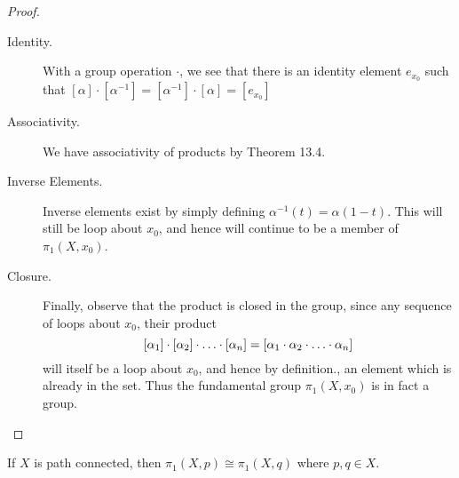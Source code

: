 \documentclass[a4paper,12pt,twoside]{hmcpset}
\begin{document}
\begin{proof}
    \begin{description}
        \item[Identity.] With a group operation $\cdot$, we see that there is an identity
        element $e_{x_0}$ such that $[\alpha] \cdot [\alpha^{-1}] =
        [\alpha^{-1}] \cdot [\alpha] = [e_{x_0}]$ 
        
        \item[Associativity.] We have associativity of products by Theorem 13.4. 
        
        \item[Inverse Elements.] Inverse elements exist by simply defining $\alpha^{-1}(t) = \alpha(1
        - t)$. This will still be loop about $x_0$, and hence will
        continue to be a member of $\pi_1(X, x_0)$.

        \item[Closure.] Finally, observe that the product is closed in the group, since
        any sequence of loops about $x_0$, their product
        \[
            [\alpha_{1}]\cdot[\alpha_{2}]\cdot \vspace{0.01mm} \dots \vspace{0.01mm} \cdot [\alpha_{n}] = [\alpha_1 \cdot \alpha_{2} \cdot  \vspace{0.01mm} \dots \vspace{0.01mm}  \cdot \alpha_{n}]
        \]
        will itself be a loop about
        $x_0$, and hence by definition., an element which is already in
        the set. Thus the fundamental group $\pi_1(X, x_0)$ is in fact
        a group.
    \end{description}    





\end{proof}

\begin{problem}[Theorem 13.7]
    If $X$ is path connected, then $\pi_1(X, p) \cong \pi_1(X, q)$
    where $p, q \in X$.
\end{problem}
\end{document}
